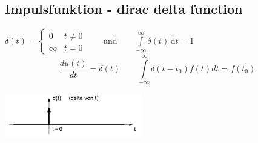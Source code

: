 \subsection{Impulsfunktion - dirac delta function}
	\begin{minipage}{10cm}
		$\delta (t)=\begin{cases} 0 & t\ne 0\\\infty & t=0\end{cases} \qquad
		\text{und} \qquad \int\limits_{-\infty}^\infty \delta(t) \, \mathrm dt = 1 $\\
		$$\frac{du(t)}{dt}=\delta(t) \qquad
		\int\limits_{-\infty}^{\infty}\delta(t-t_0)f(t)dt=f(t_0)$$
	\end{minipage}
	\begin{minipage}{8cm}
		\includegraphics[width=6cm]{./bilder/diracimpulse.png}
	\end{minipage}
